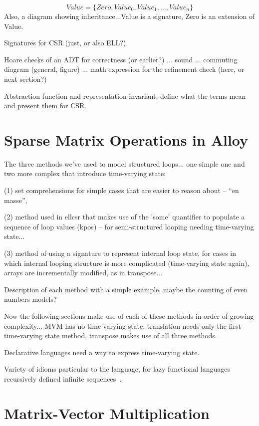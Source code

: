 \documentclass{article}
\begin{document}
\cbstart
\begin{displaymath}
Value = \{Zero, Value_0, Value_1, \ldots, Value_n\}
\end{displaymath}
Also, a diagram showing inheritance...Value is a signature, Zero is an extension of Value.
\cbend

Signatures for CSR (just, or also ELL?).

Hoare checks of an ADT for correctness (or earlier?) ... sound
  ... commuting diagram (general, figure) ... math expression for the
  refinement check (here, or next section?)

Abstraction function and representation invariant, define what the
terms mean and present them for CSR.

\section{Sparse Matrix Operations in Alloy}

\cbstart
The three methods we've used to model structured loops... one simple one and two more complex that introduce time-varying state:

(1) set comprehensions for simple cases that are easier to reason about -- ``en masse'', 

(2) method used in ellcsr that makes use of the 'some' quantifier to populate a sequence of loop values (kpos) -- for semi-structured looping needing time-varying state... 

(3) method of using a signature to represent internal loop state, for cases in which internal looping structure is more complicated (time-varying state again), arrays are incrementally modified, as in transpose...

Description of each method with a simple example, maybe the counting of even numbers models?

Now the following sections make use of each of these methods in order of growing complexity... MVM has no time-varying state, translation needs only the first time-varying state method, transpose makes use of all three methods.
\cbend

\cbstart
Declarative languages need a way to express time-varying state.

Variety of idioms particular to the language, for lazy functional
languages recursively defined infinite
sequences~\cite{hughes1989functional}.
\cbend

\section{Matrix-Vector Multiplication}
\end{document}
